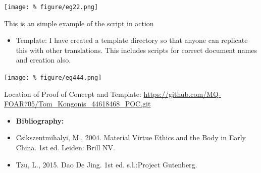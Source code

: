 \documentclass[unknownkeysallowed,usepdftitle=false, aspectratio=169, parskip=full]{beamer}
\newcommand{\secvariable}{nothing}
\newcommand{\mysection}[1]{\renewcommand{\secvariable}{#1}
}
\begin{document}
\mysection{major}
\begin{frame}\label{\secvariable} %
\begin{center}
\texttt{[image: \%
figure/eg22.png]}
\end{center}
This is an simple example of the script in action
\end{frame}

\mysection{slab}
\begin{frame}\label{\secvariable}

   \begin{flushleft}
   \parbox{\linewidth}{
\begin{itemize}
\item{Template: I have created a template directory so that anyone can replicate this with other translations. This includes scripts for correct document names and creation also.} 
\end{itemize}
}
\begin{flushright}
\texttt{[image: \%
figure/eg444.png]}
\end{flushright}
\end{flushleft}
\end{frame}








\mysection{minor}



\begin{frame}\label{\secvariable}

%

Location of Proof of Concept and Template: \url{https://github.com/MQ-FOAR705/Tom_Kongonis_44618468_POC.git}

\vspace{5mm}

\begin{itemize}
\item{\textbf{Bibliography:}}
\item{Csikszentmihalyi, M., 2004. Material Virtue Ethics and the Body in Early China. 1st ed. Leiden: Brill NV.}

\item{Tzu, L., 2015. Dao De Jing. 1st ed. s.l.:Project Gutenberg.}
\end{itemize}

\end{frame}

\mysection{conclusion}
\end{document}
